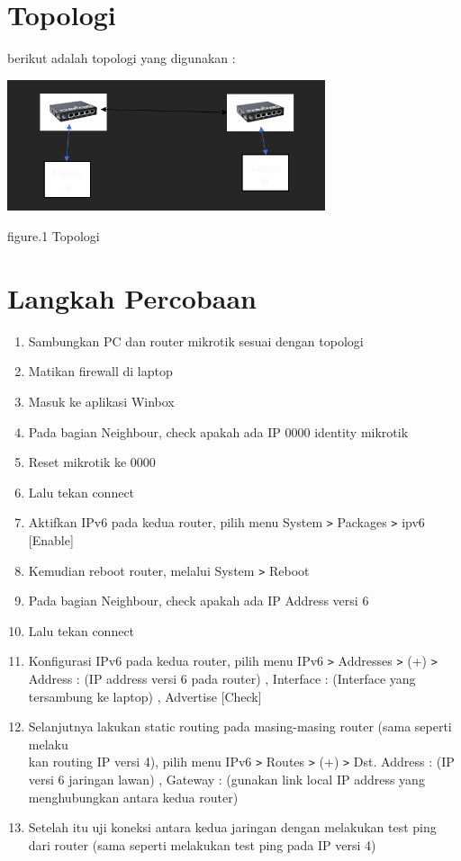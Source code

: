 \section{Topologi}

berikut adalah topologi yang digunakan :

\begin{center}
    \includegraphics[width=0.7\textwidth]{image/P5/Topologi.png}    
    
    figure.1 Topologi
\end{center}


\section{Langkah Percobaan}
\begin{enumerate}
    \item Sambungkan PC dan router mikrotik sesuai dengan topologi
    \item Matikan firewall di laptop
    \item Masuk ke aplikasi Winbox
    \item Pada bagian Neighbour, check apakah ada IP 0000 identity mikrotik
    \item Reset mikrotik ke 0000
    \item Lalu tekan connect
    \item Aktifkan IPv6 pada kedua router, pilih menu System \texttt{\text>} Packages \texttt{\text>} ipv6 [Enable]
    \item Kemudian reboot router, melalui System \texttt{\text>} Reboot
    \item Pada bagian Neighbour, check apakah ada IP Address versi 6
    \item Lalu tekan connect
    \item Konfigurasi IPv6 pada kedua router, pilih menu IPv6 \texttt{\text>} Addresses \texttt{\text>} (+) \texttt{\text>} Address : (IP address versi 6 pada router) , Interface : (Interface yang tersambung ke laptop) , Advertise [Check]
    \item Selanjutnya lakukan static routing pada masing-masing router (sama seperti melaku\\kan routing IP versi 4), pilih menu IPv6 \texttt{\text>} Routes \texttt{\text>} (+) \texttt{\text>} Dst. Address : (IP versi 6 jaringan lawan) , Gateway : (gunakan link local IP address yang menghubungkan antara kedua router)
    \item Setelah itu uji koneksi antara kedua jaringan dengan melakukan test ping dari router (sama seperti melakukan test ping pada IP versi 4)
    
\end{enumerate}

